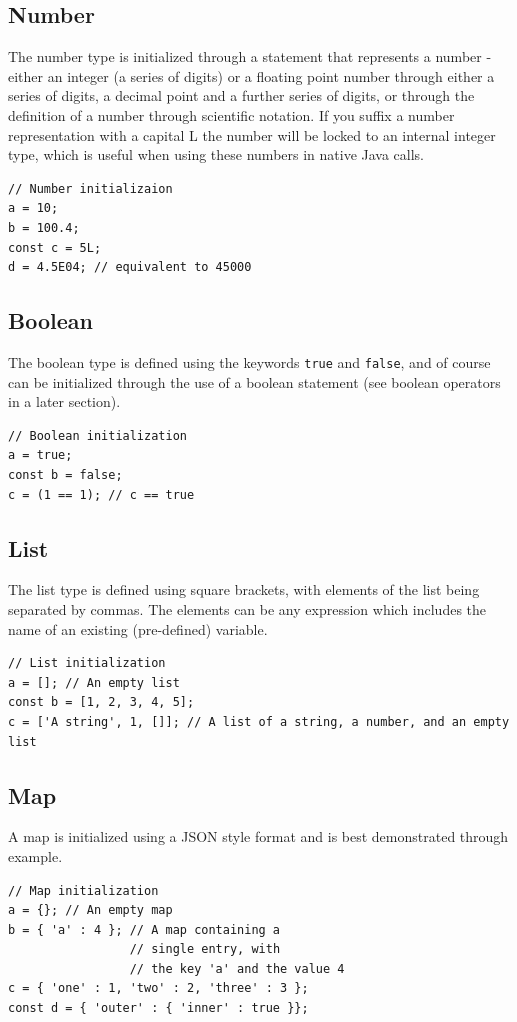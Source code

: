 \subsection{Number}
The number  type is initialized through a statement that represents a number - either an integer (a series of digits) or a floating point number through either a series of digits, a decimal point and a further series of digits, or through the definition of a number through scientific notation. If you suffix a number representation with a capital L the number will be locked to an internal integer  type, which is useful when using these numbers in native Java calls.
\begin{lstlisting}[caption={Number initialization}]
// Number initializaion
a = 10;
b = 100.4;
const c = 5L;
d = 4.5E04; // equivalent to 45000
\end{lstlisting}
\subsection{Boolean}
The boolean  type is defined using the keywords \verb+true+ and \verb+false+, and of course can be initialized through the use of a boolean statement (see boolean operators in a later section).
\begin{lstlisting}[caption={Boolean initialization}]
// Boolean initialization
a = true;
const b = false;
c = (1 == 1); // c == true
\end{lstlisting}
\subsection{List}
The list  type is defined using square brackets, with elements of the list being separated by commas. The elements can be any expression which includes the name of an existing (pre-defined) variable.
\begin{lstlisting}[caption={List initialization}]
// List initialization
a = []; // An empty list
const b = [1, 2, 3, 4, 5]; 
c = ['A string', 1, []]; // A list of a string, a number, and an empty list
\end{lstlisting}
\subsection{Map}
A map  is initialized using a JSON style format and is best demonstrated through example.
\begin{lstlisting}[caption={Map initialization}]
// Map initialization
a = {}; // An empty map
b = { 'a' : 4 }; // A map containing a 
                 // single entry, with 
                 // the key 'a' and the value 4
c = { 'one' : 1, 'two' : 2, 'three' : 3 };
const d = { 'outer' : { 'inner' : true }};
\end{lstlisting}
